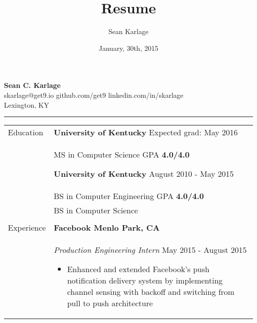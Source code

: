 \documentclass[11pt]{article}
\begin{document}
\title{Resume}            %
\author{Sean Karlage}    %
\date{January, 30th, 2015}    %
\thispagestyle{empty}
\pagestyle{empty}

\begin{center}
    {\LARGE\textbf{Sean C. Karlage}} \\
    skarlage@get9.io \hspace{0.20cm} github.com/get9 \hspace{0.20cm} linkedin.com/in/skarlage \\
    Lexington, KY \vspace{1.0mm}\hrule
\end{center}

\vspace{0.05in}\noindent
\begin{tabular}{p{0.75in} p{5.45in}}

    {Education} &

        \textbf{University of Kentucky} \hfill Expected grad: May 2016 \vspace{0.015in} \\ &
        MS in Computer Science \hfill GPA \textbf{4.0/4.0} \vspace{0.09in}

        \textbf{University of Kentucky} \hfill August 2010 - May 2015 \vspace{0.015in} \\ &
        BS in Computer Engineering \hfill GPA \textbf{4.0/4.0} \vspace{0.015in} \\ &
        BS in Computer Science \\ \\[0.015in]

    {Experience} &
        \textbf{Facebook \hfill Menlo Park, CA} \vspace{0.015in} \\ &
        {\textit{Production Engineering Intern} \hfill May 2015 - August 2015} \vspace{0.02in}
        \begin{itemize}
            \renewcommand{\labelitemi}{$\diamond$}
            \item Enhanced and extended Facebook's push notification delivery system by implementing channel sensing with backoff and switching from pull to push architecture
        \end{itemize} \vspace{0.09in}


\end{tabular}
\end{document}
